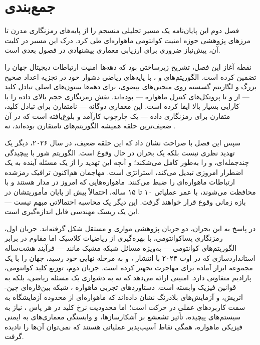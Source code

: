 \documentclass[a4paper,14pt]{extreport}
\begin{document}
\section{جمع‌بندی}

فصل دوم این پایان‌نامه یک مسیر تحلیلی منسجم را از پایه‌های رمزنگاری مدرن تا مرزهای پژوهشی حوزه امنیت کوانتومی ماهواره‌ای طی کرد. درک این مسیر در کلیت آن، پیش‌نیاز ضروری برای ارزیابی معماری پیشنهادی در فصول بعدی است.

نقطه آغاز این فصل، تشریح زیرساختی بود که دهه‌ها امنیت ارتباطات دیجیتال جهان را تضمین کرده است. الگوریتم‌های  و ، با پایه‌های ریاضی دشوار خود در تجزیه اعداد صحیح بزرگ و لگاریتم گسسته روی منحنی‌های بیضوی، برای دهه‌ها ستون‌های اصلی تبادل کلید --- از  و  تا پروتکل‌های کنترل ماهواره --- بوده‌اند.  نقش رمزنگاری حجم بالای داده را با کارایی بسیار بالا ایفا کرده است. این معماری دوگانه --- نامتقارن برای تبادل کلید، متقارن برای رمزنگاری داده --- یک چارچوب کارآمد و بلوغ‌یافته است که در آن ضعیف‌ترین حلقه همیشه الگوریتم‌های نامتقارن بوده‌اند، نه .

سپس این فصل با صراحت نشان داد که این حلقه ضعیف، در سال ۲۰۲۶، دیگر یک تهدید نظری نیست بلکه یک بحران در حال وقوع است. الگوریتم شور با پیچیدگی چندجمله‌ای،  و  را به‌طور کامل می‌شکند؛ و آنچه این تهدید را از یک مسئله آینده به یک اضطرار امروزی تبدیل می‌کند، استراتژی  است. مهاجمان هم‌اکنون ترافیک رمزشده ارتباطات ماهواره‌ای را ضبط می‌کنند. ماهواره‌هایی که امروز در مدار هستند و با  محافظت می‌شوند، با عمر عملیاتی ۱۰ تا ۱۵ ساله، احتمالاً پیش از پایان مأموریتشان در بازه زمانی وقوع  قرار خواهند گرفت. این دیگر یک محاسبه احتمالاتی مبهم نیست --- این یک ریسک مهندسی قابل اندازه‌گیری است.

در پاسخ به این بحران، دو جریان پژوهشی موازی و مستقل شکل گرفته‌اند. جریان اول، رمزنگاری پساکوانتومی، با بهره‌گیری از ریاضیات کلاسیک اما مقاوم در برابر الگوریتم‌های کوانتومی --- به‌ویژه مسائل شبکه مشبک مانند  --- فرآیند هشت‌ساله استانداردسازی  که در اوت ۲۰۲۴ با انتشار ،  و  به مرحله نهایی خود رسید، جهان را با یک مجموعه ابزار آماده برای مهاجرت تجهیز کرده است. جریان دوم، توزیع کلید کوانتومی، پارادیم متفاوتی دارد.  امنیتی ارائه می‌دهد که نه به دشواری یک مسئله ریاضی، بلکه به قوانین فیزیک وابسته است. دستاوردهای تجربی ماهواره ، شبکه بین‌قاره‌ای چین-اتریش، و آزمایش‌های بلادرنگ نشان داده‌اند که  ماهواره‌ای از محدوده آزمایشگاه به سمت کاربردهای عملی در حرکت است؛ اما محدودیت نرخ کلید در هر پاس ، نیاز به سیستم‌های  پیچیده، تأثیر تشعشع بر آشکارسازها، و وابستگی معماری‌های  به ایمنی فیزیکی ماهواره، همگی نقاط آسیب‌پذیر عملیاتی هستند که نمی‌توان آن‌ها را نادیده گرفت.
\end{document}
